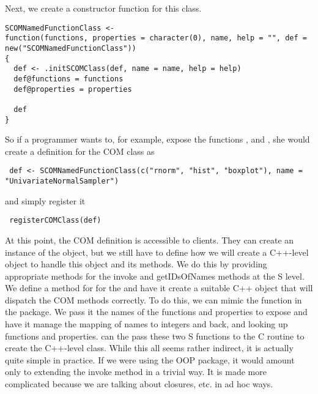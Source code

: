 \documentclass[11pt]{article}
\begin{document}
Next, we create a constructor function for this class.
\begin{verbatim}
SCOMNamedFunctionClass <-
function(functions, properties = character(0), name, help = "", def = new("SCOMNamedFunctionClass"))
{
  def <- .initSCOMClass(def, name = name, help = help) 
  def@functions = functions
  def@properties = properties

  def
}
\end{verbatim}

So if a programmer wants to, for example, expose the functions
,  and ,
she would create a definition for the COM class as 
\begin{verbatim}
 def <- SCOMNamedFunctionClass(c("rnorm", "hist", "boxplot"), name = "UnivariateNormalSampler") 
\end{verbatim}
and simply register it
\begin{verbatim}
 registerCOMClass(def)
\end{verbatim}

At this point, the COM definition is accessible to clients.  They can
create an instance of the object, but we still have to define how we
will create a C++-level object to handle this object and its methods.
We do this by providing appropriate methods for the invoke and
getIDsOfNames methods at the S level.  We define a method for
 for the 
and have it create a suitable C++ object that will dispatch the COM
methods correctly. To do this, we can mimic the
 function in the 
package. We pass it the names of the functions and properties to
expose and have it manage the mapping of names to integers and back,
and looking up functions and properties.  
can the pass these two S functions to the C routine
 to create the C++-level class.  While this all
seems rather indirect, it is actually quite simple in practice.  If we
were using the OOP package, it would amount only to extending the
invoke method in a trivial way. It is made more complicated because we
are talking about closures, etc. in ad hoc ways.
\end{document}
